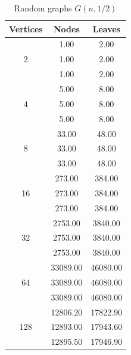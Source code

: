 \begin{table}[h]
    \centering
    \begin{tabular}{ccc}
    \toprule
    Vertices & Nodes & Leaves \\
    \midrule
    \multirow{3}{*}{2} & 1.00 & 2.00 \\
     & 1.00 & 2.00 \\
     & 1.00 & 2.00 \\
    \cmidrule(lr){1-3}
    \multirow{3}{*}{4} & 5.00 & 8.00 \\
     & 5.00 & 8.00 \\
     & 5.00 & 8.00 \\
    \cmidrule(lr){1-3}
    \multirow{3}{*}{8} & 33.00 & 48.00 \\
     & 33.00 & 48.00 \\
     & 33.00 & 48.00 \\
    \cmidrule(lr){1-3}
    \multirow{3}{*}{16} & 273.00 & 384.00 \\
     & 273.00 & 384.00 \\
     & 273.00 & 384.00 \\
    \cmidrule(lr){1-3}
    \multirow{3}{*}{32} & 2753.00 & 3840.00 \\
     & 2753.00 & 3840.00 \\
     & 2753.00 & 3840.00 \\
    \cmidrule(lr){1-3}
    \multirow{3}{*}{64} & 33089.00 & 46080.00 \\
     & 33089.00 & 46080.00 \\
     & 33089.00 & 46080.00 \\
    \cmidrule(lr){1-3}
    \multirow{3}{*}{128} & 12806.20 & 17822.90 \\
     & 12893.00 & 17943.60 \\
     & 12895.50 & 17946.90 \\
    \bottomrule
    \end{tabular}
    \caption{Random graphs $G(n, 1/2)$}
\end{table}
